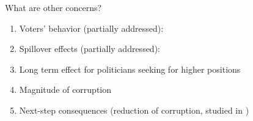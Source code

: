    \begin{frame}{What are other concerns?}
        \begin{enumerate}
            \item<1-> Voters' behavior (partially addressed):
            \item<3-> Spillover effects (partially addressed):
            \item<5-> Long term effect for politicians seeking for higher positions
            \item<6-> Magnitude of corruption 
            \item<7-> Next-step consequences (reduction of corruption, studied in \citet{avis2018government})
        \end{enumerate}

    \end{frame}

